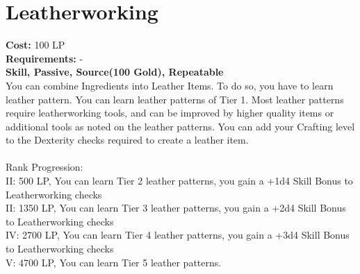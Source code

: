 \section{Leatherworking}\label{perk:leatherworking}
\textbf{Cost:} 100 LP\\
\textbf{Requirements:} -\\
\textbf{Skill, Passive, Source(100 Gold), Repeatable}\\
You can combine Ingredients into Leather Items.
To do so, you have to learn leather pattern.
You can learn leather patterns of Tier 1.
Most leather patterns require leatherworking tools, and can be improved by higher quality items or additional tools as noted on the leather patterns.
You can add your Crafting level to the Dexterity checks required to create a leather item.\\
\\
Rank Progression:\\
II: 500 LP, You can learn Tier 2 leather patterns, you gain a +1d4 Skill Bonus to Leatherworking checks\\
II: 1350 LP, You can learn Tier 3 leather patterns, you gain a +2d4 Skill Bonus to Leatherworking checks\\
IV: 2700 LP, You can learn Tier 4 leather patterns, you gain a +3d4 Skill Bonus to Leatherworking checks\\
V: 4700 LP, You can learn Tier 5 leather patterns.\\